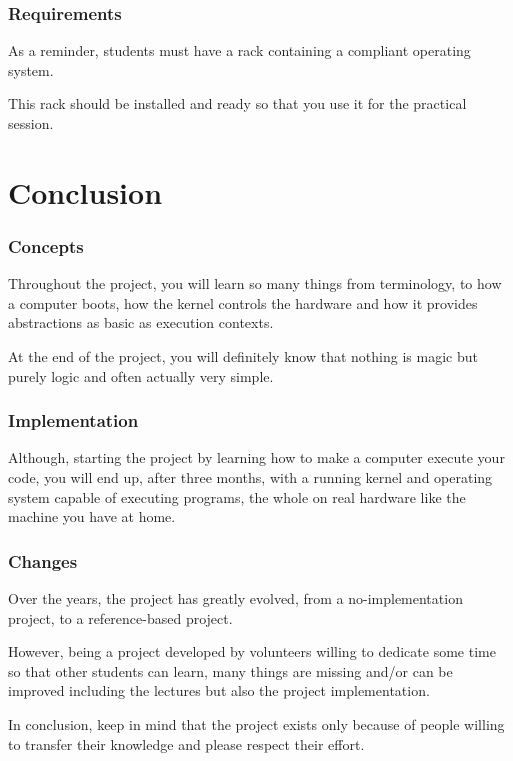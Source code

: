 \begin{frame}
  \frametitle{Requirements}

  As a reminder, students must have a rack containing a  compliant
  operating system.

  \-

  This rack should be installed and ready so that you use it for the
   practical session.
\end{frame}

%
%

\section{Conclusion}


\begin{frame}
  \frametitle{Concepts}

  Throughout the project, you will learn so many things from terminology,
  to how a computer boots, how the kernel controls the hardware and how it
  provides abstractions as basic as execution contexts.

  \-

  At the end of the project, you will definitely know that nothing is magic
  but purely logic and often actually very simple.
\end{frame}


\begin{frame}
  \frametitle{Implementation}

  Although, starting the project by learning how to make a computer execute
  your code, you will end up, after three months, with a running kernel
  and operating system capable of executing programs, the whole on real
  hardware like the machine you have at home.
\end{frame}


\begin{frame}
  \frametitle{Changes}

  Over the years, the project has greatly evolved, from a no-implementation
  project, to a reference-based project.

  \-

  However, being a project developed by volunteers willing to dedicate some
  time so that other students can learn, many things are missing and/or
  can be improved including the lectures but also the project implementation.

  \-

  In conclusion, keep in mind that the project exists only because of people
  willing to transfer their knowledge and please respect their effort.
\end{frame}

